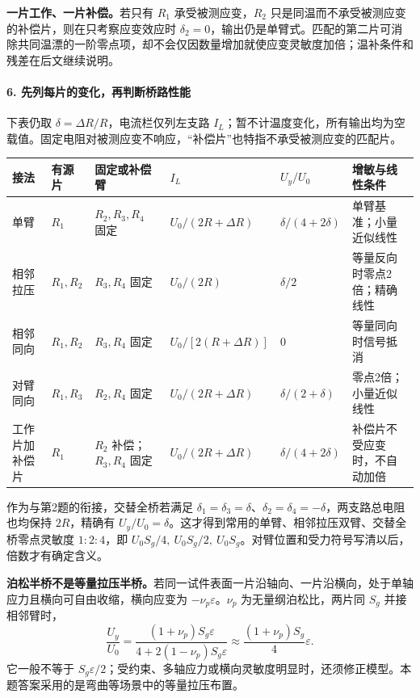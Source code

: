 \textbf{一片工作、一片补偿。}若只有 $R_1$ 承受被测应变，$R_2$ 只是同温而不承受被测应变的补偿片，则在只考察应变效应时 $\delta_2=0$，输出仍是单臂式。匹配的第二片可消除共同温漂的一阶零点项，却不会仅因数量增加就使应变灵敏度加倍；温补条件和残差在后文继续说明。

\paragraph{6. 先列每片的变化，再判断桥路性能}
下表仍取 $\delta=\Delta R/R$，电流栏仅列左支路 $I_L$；暂不计温度变化，所有输出均为空载值。固定电阻对被测应变不响应，“补偿片”也特指不承受被测应变的匹配片。
\begin{center}\footnotesize
\setlength{\tabcolsep}{3pt}
\begin{tabularx}{\linewidth}{@{}>{\raggedright\arraybackslash}p{1.35cm}>{\raggedright\arraybackslash}p{1.55cm}>{\raggedright\arraybackslash}p{2.4cm}>{\centering\arraybackslash}p{2.35cm}>{\centering\arraybackslash}p{2.0cm}>{\raggedright\arraybackslash}X@{}}
\toprule
接法 & 有源片 & 固定或补偿臂 & $I_L$ & $U_y/U_0$ & 增敏与线性条件\\
\midrule
单臂 & $R_1$ & $R_2,R_3,R_4$ 固定 & $U_0/(2R+\Delta R)$ & $\delta/(4+2\delta)$ & 单臂基准；小量近似线性\\
相邻拉压 & $R_1,R_2$ & $R_3,R_4$ 固定 & $U_0/(2R)$ & $\delta/2$ & 等量反向时零点2倍；精确线性\\
相邻同向 & $R_1,R_2$ & $R_3,R_4$ 固定 & $U_0/[2(R+\Delta R)]$ & $0$ & 等量同向时信号抵消\\
对臂同向 & $R_1,R_3$ & $R_2,R_4$ 固定 & $U_0/(2R+\Delta R)$ & $\delta/(2+\delta)$ & 零点2倍；小量近似线性\\
工作片加补偿片 & $R_1$ & $R_2$ 补偿；$R_3,R_4$ 固定 & $U_0/(2R+\Delta R)$ & $\delta/(4+2\delta)$ & 补偿片不受应变时，不自动加倍\\
\bottomrule
\end{tabularx}
\end{center}
作为与第2题的衔接，交替全桥若满足 $\delta_1=\delta_3=\delta$、$\delta_2=\delta_4=-\delta$，两支路总电阻也均保持 $2R$，精确有 $U_y/U_0=\delta$。这才得到常用的单臂、相邻拉压双臂、交替全桥零点灵敏度 $1:2:4$，即 $U_0S_g/4,\ U_0S_g/2,\ U_0S_g$。对臂位置和受力符号写清以后，倍数才有确定含义。

\textbf{泊松半桥不是等量拉压半桥。}若同一试件表面一片沿轴向、一片沿横向，处于单轴应力且横向可自由收缩，横向应变为 $-\nu_p\varepsilon$。$\nu_p$ 为无量纲泊松比，两片同 $S_g$ 并接相邻臂时，
\[
\frac{U_y}{U_0}
=\frac{(1+\nu_p)S_g\varepsilon}
       {4+2(1-\nu_p)S_g\varepsilon}
\approx\frac{(1+\nu_p)S_g}{4}\varepsilon.
\]
它一般不等于 $S_g\varepsilon/2$；受约束、多轴应力或横向灵敏度明显时，还须修正模型。本题答案采用的是弯曲等场景中的等量拉压布置。

